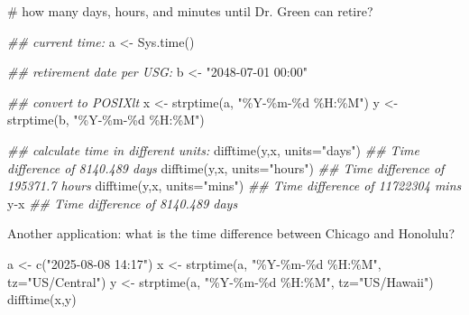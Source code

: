 \documentclass[
  13,
  letterpaper,
]{report}
\newenvironment{Shaded}{\begin{snugshade}}{\end{snugshade}}
\newcommand{\AttributeTok}[1]{\textcolor[rgb]{0.40,0.45,0.13}{#1}}
\newcommand{\CommentTok}[1]{\textcolor[rgb]{0.37,0.37,0.37}{#1}}
\newcommand{\DocumentationTok}[1]{\textcolor[rgb]{0.37,0.37,0.37}{\textit{#1}}}
\newcommand{\FunctionTok}[1]{\textcolor[rgb]{0.28,0.35,0.67}{#1}}
\newcommand{\NormalTok}[1]{\textcolor[rgb]{0.00,0.23,0.31}{#1}}
\newcommand{\OtherTok}[1]{\textcolor[rgb]{0.00,0.23,0.31}{#1}}
\newcommand{\SpecialCharTok}[1]{\textcolor[rgb]{0.37,0.37,0.37}{#1}}
\newcommand{\StringTok}[1]{\textcolor[rgb]{0.13,0.47,0.30}{#1}}
\begin{document}
\begin{Shaded}
\begin{Highlighting}[]

\CommentTok{\# how many days, hours, and minutes until Dr. Green can retire?}

\DocumentationTok{\#\# current time:}
\NormalTok{a }\OtherTok{\textless{}{-}} \FunctionTok{Sys.time}\NormalTok{()}

\DocumentationTok{\#\# retirement date per USG:}
\NormalTok{b }\OtherTok{\textless{}{-}} \StringTok{"2048{-}07{-}01 00:00"}

\DocumentationTok{\#\# convert to POSIXlt}
\NormalTok{x }\OtherTok{\textless{}{-}} \FunctionTok{strptime}\NormalTok{(a, }\StringTok{"\%Y{-}\%m{-}\%d \%H:\%M"}\NormalTok{)}
\NormalTok{y }\OtherTok{\textless{}{-}} \FunctionTok{strptime}\NormalTok{(b, }\StringTok{"\%Y{-}\%m{-}\%d \%H:\%M"}\NormalTok{)}

\DocumentationTok{\#\# calculate time in different units:}
\FunctionTok{difftime}\NormalTok{(y,x, }\AttributeTok{units=}\StringTok{"days"}\NormalTok{)}
\DocumentationTok{\#\# Time difference of 8140.489 days}
\FunctionTok{difftime}\NormalTok{(y,x, }\AttributeTok{units=}\StringTok{"hours"}\NormalTok{)}
\DocumentationTok{\#\# Time difference of 195371.7 hours}
\FunctionTok{difftime}\NormalTok{(y,x, }\AttributeTok{units=}\StringTok{"mins"}\NormalTok{)}
\DocumentationTok{\#\# Time difference of 11722304 mins}
\NormalTok{y}\SpecialCharTok{{-}}\NormalTok{x}
\DocumentationTok{\#\# Time difference of 8140.489 days}
\end{Highlighting}
\end{Shaded}

Another application: what is the time difference between Chicago and
Honolulu?

\begin{Shaded}
\begin{Highlighting}[]
\NormalTok{a }\OtherTok{\textless{}{-}} \FunctionTok{c}\NormalTok{(}\StringTok{"2025{-}08{-}08 14:17"}\NormalTok{)}
\NormalTok{x }\OtherTok{\textless{}{-}} \FunctionTok{strptime}\NormalTok{(a, }\StringTok{"\%Y{-}\%m{-}\%d \%H:\%M"}\NormalTok{, }\AttributeTok{tz=}\StringTok{"US/Central"}\NormalTok{)}
\NormalTok{y }\OtherTok{\textless{}{-}} \FunctionTok{strptime}\NormalTok{(a, }\StringTok{"\%Y{-}\%m{-}\%d \%H:\%M"}\NormalTok{, }\AttributeTok{tz=}\StringTok{"US/Hawaii"}\NormalTok{)}
\FunctionTok{difftime}\NormalTok{(x,y)}
\end{Highlighting}
\end{Shaded}
\end{document}
